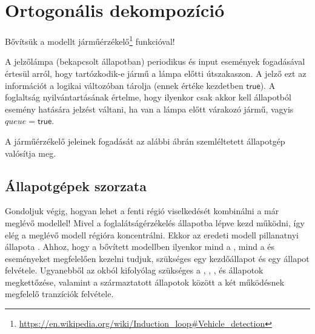 
\section{Ortogonális dekompozíció}

Bővítsük a modellt járműérzékelő\footnote{\url{https://en.wikipedia.org/wiki/Induction\_loop\#Vehicle\_detection}} funkcióval!

\begin{tipp}
	A jelzőlámpa (bekapcsolt állapotban) periodikus  és  input események fogadásával értesül arról, hogy tartózkodik-e jármű a lámpa előtti útszakaszon. A jelző ezt az információt a  logikai változóban tárolja (ennek értéke kezdetben $\mathsf{true}$). A foglaltság nyilvántartásának értelme, hogy ilyenkor csak akkor kell  állapotból  esemény hatására jelzést váltani, ha van a lámpa előtt várakozó jármű, vagyis $\mathit{queue} = \mathsf{true}$.
\end{tipp}

A járműérzékelő jeleinek fogadását az alábbi ábrán szemléltetett állapotgép valósítja meg.


\subsection{Állapotgépek szorzata}

Gondoljuk végig, hogyan lehet a fenti  régió viselkedését kombinálni a már meglévő modellel! Mivel a foglalátságérzékelés  állapotba lépve kezd működni, így elég a meglévő modell  régióra koncentrálni. Ekkor az eredeti modell pillanatnyi állapota . Ahhoz, hogy a bővített modellben ilyenkor mind a , mind a  és  eseményeket megfelelően kezelni tudjuk, szükséges egy  kezdőállapot és egy  állapot felvétele. Ugyanebből az okból kifolyólag szükséges a , , ,  és  állapotok megkettőzése, valamint a származtatott állapotok között a két működésnek megfelelő tranzíciók felvétele.

